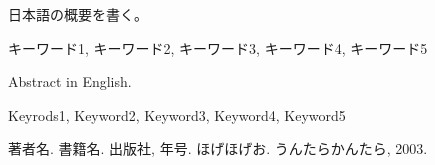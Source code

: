 \documentclass[openany,11pt,papersize,dvipdfm,draft]{jsbook}
\begin{document}
%
\maketitle

\frontmatter

\begin{jabstract} 日本語の概要を書く。
\begin{jkeyword}
キーワード1, キーワード2, キーワード3, キーワード4, キーワード5
\end{jkeyword}
\end{jabstract}

\begin{eabstract} Abstract in English. 
\begin{ekeyword}
Keyrods1, Keyword2, Keyword3, Keyword4, Keyword5
\end{ekeyword}
\end{eabstract}

\tableofcontents%

\mainmatter%




\begin{appendix}



\end{appendix}


\begin{thebibliography}{9}
  著者名. 書籍名. 出版社,  年号.
  ほげほげお. うんたらかんたら,  2003.
\end{thebibliography}
\end{document}
